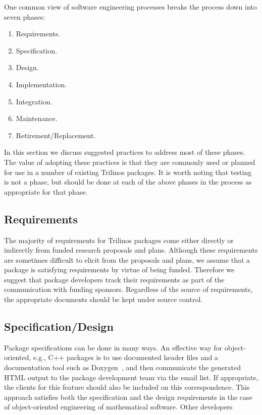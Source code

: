 \documentclass[12pt,relax]{TrilinosDevGuide}
\begin{document}
One common view of software engineering processes breaks the process down into 
seven phases:
\begin{enumerate}
\item Requirements.
\item Specification.
\item Design.
\item Implementation.
\item Integration.
\item Maintenance.
\item Retirement/Replacement.
\end{enumerate}
In this section we discuss suggested practices to address most of these 
phases.  The value of adopting these practices is that they are commonly used 
or planned for use in a number of existing Trilinos packages.  It is worth 
noting that testing is not a phase, but should be done at each of the above 
phases in the process as appropriate for that phase.

\subsection{Requirements}
The majority of requirements for Trilinos packages come either directly or 
indirectly from funded research proposals and plans.  Although these 
requirements are sometimes difficult to elicit from the proposals and plans, 
we assume that a package is satisfying requirements by virtue of being 
funded.  Therefore we suggest that package developers track their 
requirements as part of the communication with funding sponsors.
Regardless of the source of requirements, the appropriate documents
should be kept under source control.

\subsection{Specification/Design}
Package specifications can be done in many ways.  An effective way for 
object-oriented, e.g., C++ packages is to use documented header files and a 
documentation tool such as Doxygen~\cite{doxyen}, and then communicate the 
generated HTML output to the package development team via the 
 email list.  If
appropriate, the clients for this feature should also be included on
this correspondence.  This
approach satisfies both the specification and the design requirements
in the case of object-oriented engineering of mathematical software.
Other developers
\end{document}
